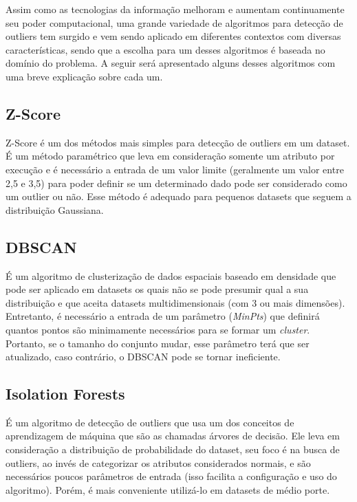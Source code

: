 Assim como as tecnologias da informação melhoram e aumentam continuamente seu poder computacional, uma grande variedade de algoritmos para detecção de outliers tem surgido e vem sendo aplicado em diferentes contextos com diversas características, sendo que a escolha para um desses algoritmos é baseada no domínio do problema. A seguir será apresentado alguns desses algoritmos com uma breve explicação sobre cada um.

\subsection{Z-Score}

Z-Score \cite{doi:10.1111/j.1540-6261.1968.tb00843.x} é um dos métodos mais simples para detecção de outliers em um dataset. É um método paramétrico que leva em consideração somente um atributo por execução e é necessário a entrada de um valor limite (geralmente um valor entre 2,5 e 3,5) para poder definir se um determinado dado pode ser considerado como um outlier ou não. Esse método é adequado para pequenos datasets que seguem a distribuição Gaussiana.

\subsection{DBSCAN}

É um algoritmo de clusterização de dados espaciais baseado em densidade \cite{Ester:1996:DAD:3001460.3001507} que pode ser aplicado em datasets os quais não se pode presumir qual a sua distribuição e que aceita datasets multidimensionais (com 3 ou mais dimensões). Entretanto, é necessário a entrada de um parâmetro (\textit{MinPts}) que definirá quantos pontos são minimamente necessários para se formar um \textit{cluster}. Portanto, se o tamanho do conjunto mudar, esse parâmetro terá que ser atualizado, caso contrário, o DBSCAN pode se tornar ineficiente.

\subsection{Isolation Forests}

É um algoritmo de detecção de outliers \cite{IsolationForests} que usa um dos conceitos de aprendizagem de máquina que são as chamadas árvores de decisão. Ele leva em consideração a distribuição de probabilidade do dataset, seu foco é na busca de outliers, ao invés de categorizar os atributos considerados normais, e são necessários poucos parâmetros de entrada (isso facilita a configuração e uso do algoritmo). Porém, é mais conveniente utilizá-lo em datasets de médio porte.

